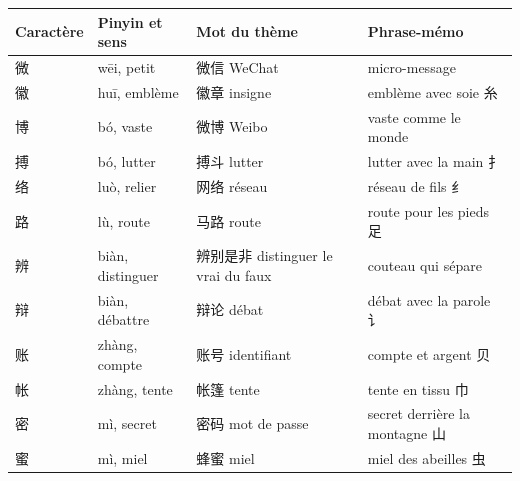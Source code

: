 \documentclass[11pt]{article}
\begin{document}
\begin{center}
\begin{tabularx}{\linewidth}{|X|X|X|X|}
\hline
\rowcolor{popblueL} Caractère & Pinyin et sens & Mot du thème & Phrase-mémo \\
\hline
微 & wēi, petit & 微信 WeChat & micro-message \\
\hline
徽 & huī, emblème & 徽章 insigne & emblème avec soie 糸 \\
\hline
博 & bó, vaste & 微博 Weibo & vaste comme le monde \\
\hline
搏 & bó, lutter & 搏斗 lutter & lutter avec la main 扌 \\
\hline
络 & luò, relier & 网络 réseau & réseau de fils 纟 \\
\hline
路 & lù, route & 马路 route & route pour les pieds 足 \\
\hline
辨 & biàn, distinguer & 辨别是非 distinguer le vrai du faux & couteau qui sépare \\
\hline
辩 & biàn, débattre & 辩论 débat & débat avec la parole 讠 \\
\hline
账 & zhàng, compte & 账号 identifiant & compte et argent 贝 \\
\hline
帐 & zhàng, tente & 帐篷 tente & tente en tissu 巾 \\
\hline
密 & mì, secret & 密码 mot de passe & secret derrière la montagne 山 \\
\hline
蜜 & mì, miel & 蜂蜜 miel & miel des abeilles 虫 \\
\hline
\end{tabularx}
\end{center}
\end{document}
